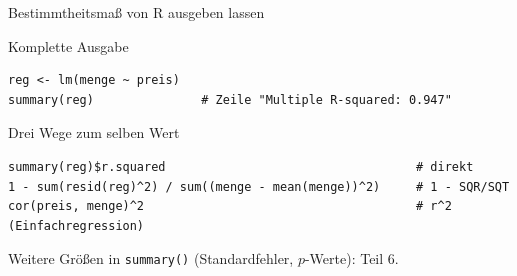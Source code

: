 \documentclass[aspectratio=169,11pt]{beamer}
\begin{document}


\begin{frame}[fragile]{Bestimmtheitsmaß von R ausgeben lassen}
  \small\lstset{basicstyle=\ttfamily\footnotesize,aboveskip=3pt,belowskip=3pt}
  \begin{block}{Komplette Ausgabe}
\begin{lstlisting}
reg <- lm(menge ~ preis)
summary(reg)               # Zeile "Multiple R-squared: 0.947"
\end{lstlisting}
  \end{block}

  \begin{exampleblock}{Drei Wege zum selben Wert}
\begin{lstlisting}
summary(reg)$r.squared                                   # direkt
1 - sum(resid(reg)^2) / sum((menge - mean(menge))^2)     # 1 - SQR/SQT
cor(preis, menge)^2                                      # r^2 (Einfachregression)
\end{lstlisting}
  \end{exampleblock}

  \footnotesize Weitere Größen in \texttt{summary()} (Standardfehler, $p$-Werte): Teil 6.\par
\end{frame}
\end{document}
